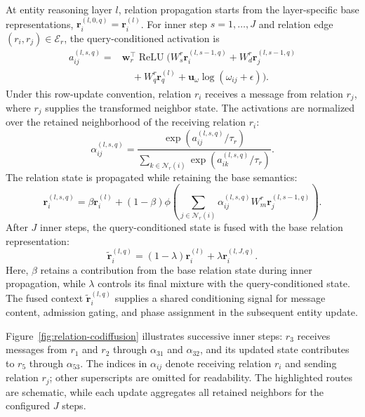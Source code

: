 \documentclass[a4paper,fleqn]{cas-dc}
\begin{document}
At entity reasoning layer $l$, relation propagation starts from the layer-specific base representations, $\mathbf{r}_{i}^{(l,0,q)}=\mathbf{r}_{i}^{(l)}$. For inner step $s=1,\ldots,J$ and relation edge $(r_i,r_j)\in\mathcal{E}_{r}$, the query-conditioned activation is
\begin{equation}
\begin{split}
a_{ij}^{(l,s,q)}
={}&
\mathbf{w}_{r}^{\top}\operatorname{ReLU}\bigl(
W_{s}^{r}\mathbf{r}_{i}^{(l,s-1,q)}
+W_{d}^{r}\mathbf{r}_{j}^{(l,s-1,q)}\\
&\quad+W_{q}^{r}\mathbf{r}_{q}^{(l)}
+\mathbf{u}_{\omega}\log(\omega_{ij}+\epsilon)
\bigr).
\end{split}
\label{eq:query-relation-score}
\end{equation}
Under this row-update convention, relation $r_i$ receives a message from relation $r_j$, where $r_j$ supplies the transformed neighbor state. The activations are normalized over the retained neighborhood of the receiving relation $r_i$:
\begin{equation}
\alpha_{ij}^{(l,s,q)}
=
\frac{
\exp\left(a_{ij}^{(l,s,q)}/\tau_r\right)
}{
\sum_{k\in\mathcal{N}_{r}(i)}
\exp\left(a_{ik}^{(l,s,q)}/\tau_r\right)
}.
\label{eq:query-relation-activation}
\end{equation}
The relation state is propagated while retaining the base semantics:
\begin{equation}
\mathbf{r}_{i}^{(l,s,q)}
=
\beta\mathbf{r}_{i}^{(l)}
+
(1-\beta)
\phi\left(
\sum_{j\in\mathcal{N}_{r}(i)}
\alpha_{ij}^{(l,s,q)}
W_{m}^{r}\mathbf{r}_{j}^{(l,s-1,q)}
\right).
\label{eq:relation-state-update}
\end{equation}
After $J$ inner steps, the query-conditioned state is fused with the base relation representation:
\begin{equation}
\tilde{\mathbf{r}}_{i}^{(l,q)}
=
(1-\lambda)\mathbf{r}_{i}^{(l)}
+
\lambda\mathbf{r}_{i}^{(l,J,q)}.
\label{eq:fused-relational-context}
\end{equation}
Here, $\beta$ retains a contribution from the base relation state during inner propagation, while $\lambda$ controls its final mixture with the query-conditioned state.
The fused context $\tilde{\mathbf{r}}_{i}^{(l,q)}$ supplies a shared conditioning signal for message content, admission gating, and phase assignment in the subsequent entity update.

Figure~\ref{fig:relation-codiffusion} illustrates successive inner steps: $r_3$ receives messages from $r_1$ and $r_2$ through $\alpha_{31}$ and $\alpha_{32}$, and its updated state contributes to $r_5$ through $\alpha_{53}$. The indices in $\alpha_{ij}$ denote receiving relation $r_i$ and sending relation $r_j$; other superscripts are omitted for readability. The highlighted routes are schematic, while each update aggregates all retained neighbors for the configured $J$ steps.
\end{document}
